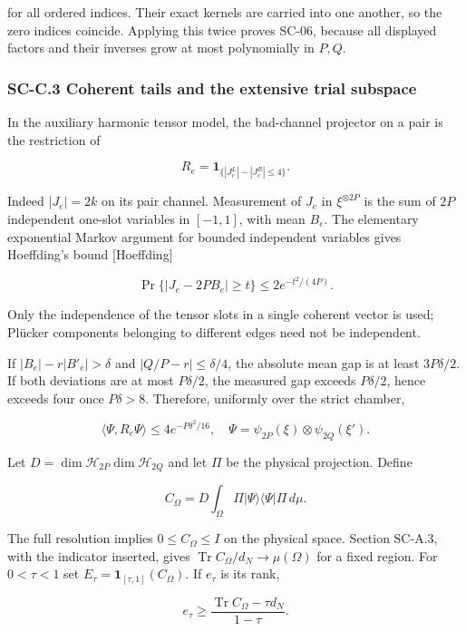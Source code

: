 \documentclass[a4paper,11pt]{article}
\numberwithin{equation}{section}
\begin{document}
for all ordered indices. Their exact kernels are carried into one another, so the zero indices coincide. Applying this twice proves SC-06, because all displayed factors and their inverses grow at most polynomially in \(P,Q\).

\hypertarget{sc-c.3-coherent-tails-and-the-extensive-trial-subspace}{%
\subsubsection{SC-C.3 Coherent tails and the extensive trial subspace}\label{sc-c.3-coherent-tails-and-the-extensive-trial-subspace}}

In the auxiliary harmonic tensor model, the bad-channel projector on a pair is the restriction of

\[
R_e=\mathbf1_{\{|J_e^L|-|J_e^R|\leq4\}}.
\]

Indeed \(|J_e|=2k\) on its pair channel. Measurement of \(J_e\) in \(\xi^{\otimes2P}\) is the sum of \(2P\) independent one-slot variables in \([-1,1]\), with mean \(B_e\). The elementary exponential Markov argument for bounded independent variables gives Hoeffding's bound {[}Hoeffding{]}

\[
\Pr\{|J_e-2PB_e|\geq t\}\leq2e^{-t^2/(4P)}.
\]

Only the independence of the tensor slots in a single coherent vector is used; Plücker components belonging to different edges need not be independent.

If \(|B_e|-r|B'_e|>\delta\) and \(|Q/P-r|\leq\delta/4\), the absolute mean gap is at least \(3P\delta/2\). If both deviations are at most \(P\delta/2\), the measured gap exceeds \(P\delta/2\), hence exceeds four once \(P\delta>8\). Therefore, uniformly over the strict chamber,

\[
\langle\Psi,R_e\Psi\rangle\leq4e^{-P\delta^2/16},
\quad\Psi=\psi_{2P}(\xi)\otimes\psi_{2Q}(\xi').
\]

Let \(D=\dim\mathcal H_{2P}\dim\mathcal H_{2Q}\) and let \(\Pi\) be the physical projection. Define

\[
C_\Omega=D\int_\Omega\Pi|\Psi\rangle\langle\Psi|\Pi\,d\mu.
\]

The full resolution implies \(0\leq C_\Omega\leq I\) on the physical space. Section SC-A.3, with the indicator inserted, gives \(\operatorname{Tr}C_\Omega/d_N\to\mu(\Omega)\) for a fixed region. For \(0<\tau<1\) set \(E_\tau=\mathbf1_{[\tau,1]}(C_\Omega)\). If \(e_\tau\) is its rank,

\[
e_\tau\geq\frac{\operatorname{Tr}C_\Omega-\tau d_N}{1-\tau}.
\]
\end{document}
